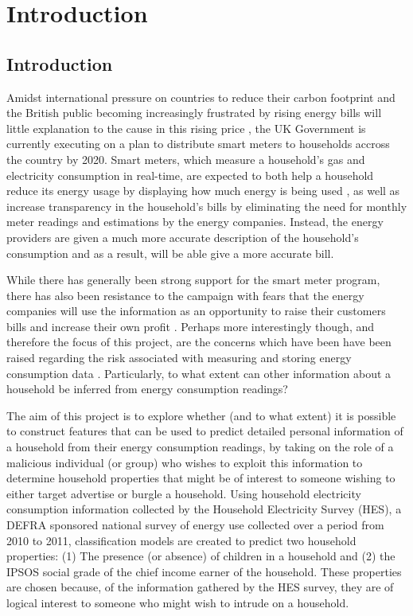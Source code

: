\chapter{Introduction}
\section{Introduction}
Amidst international pressure on countries to reduce their carbon footprint \cite{E-comm} and the British public becoming increasingly frustrated by rising energy bills will little explanation to the cause in this rising price \cite{E-spending}, the UK Government is currently executing on a plan to distribute smart meters to households accross the country by 2020. Smart meters, which measure a household's gas and electricity consumption in real-time, are expected to both help a household reduce its energy usage by displaying how much energy is being used , as well as increase transparency in the household's bills by eliminating the need for monthly meter readings and estimations by the energy companies. Instead, the energy providers are given a much more accurate description of the household's consumption and as a result, will be able give a more accurate bill.

While there has generally been strong support for the smart meter program, there has also been resistance to the campaign with fears that the energy companies will use the information as an opportunity to raise their customers bills and increase their own profit \cite{stop}. Perhaps more interestingly though, and therefore the focus of this project, are the concerns which have been have been raised regarding the risk associated with measuring and storing energy consumption data \cite{Quinn} \cite{LMW}. Particularly, to what extent can other information about a household be inferred from energy consumption readings?

The aim of this project is to explore whether (and to what extent) it is possible to construct features that can be used to predict detailed personal information of a household from their energy consumption readings, by taking on the role of a malicious individual (or group) who wishes to exploit this information to determine household properties that might be of interest to someone wishing to either target advertise or burgle a household. Using household electricity consumption information collected by the Household Electricity Survey (HES), a DEFRA sponsored national survey of energy use collected over a period from 2010 to 2011, classification models are created to predict two household properties: (1) The presence (or absence) of children in a household and (2) the IPSOS social grade of the chief income earner of the household. These properties are chosen because, of the information gathered by the HES survey, they are of logical interest to someone who might wish to intrude on a household.
\newline


